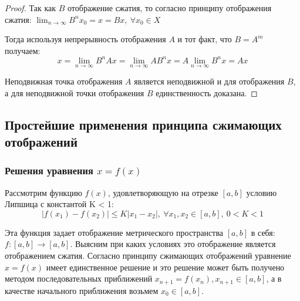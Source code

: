 \documentclass[14pt,a4paper]{extarticle}
\theoremstyle{definition}
\theoremstyle{remark}
\renewcommand{\[}{\begin{dmath*}[compact]}
\renewcommand{\]}{\end{dmath*}}
\newcommand{\ds}{\displaystyle}
\newcommand{\sep}{ , \ \allowbreak }
\begin{document}
\begin{proof}
  Так как $B$ отображение сжатия, то согласно принципу отображения сжатия:
  $\ds {\lim_{n\to \infty}B^{n}x_{0}=x=Bx}\sep{\forall x_{0}\in X}$

  Тогда используя непрерывность отображения $A$ и тот факт,
  что $B=A^{m}$ получаем:
  \[ x = \lim_{n\to \infty}B^{n}Ax =
  \lim_{n\to \infty}AB^{n}x =
  A\lim_{n\to \infty}B^{n}x = Ax\]

  Неподвижная точка отображения $A$ является неподвижной и для отображения $B$,
  а для неподвижной точки отображения $B$ единственность доказана.
\end{proof}

\subsection{Простейшие применения принципа сжимающих отображений}

\subsubsection{Решения уравнения \texorpdfstring{$x=f(x)$}{Lg}}

Рассмотрим функцию $f(x)$, удовлетворяющую на отрезке $[a, b]$ условию Липшица
с константой K < 1:
\[ |f(x_1)-f(x_2)|\leq K|x_1-x_2|\sep{\forall x_1, x_2 \in [a, b]} \sep
{0<K<1}\]

Эта функция задает отображение метрического пространства $[a, b]$ в себя:
$f:[a,b] \to[a, b]$.
Выясним при каких условиях это отображение является отображением сжатия.
Согласно принципу сжимающих отображений уравнение $x=f(x)$ имеет
единственное решение и это решение может быть получено
методом последовательных приближений $x_{n+1}=f(x_n), x_{n+1} \in [a, b]$,
а в качестве начального приближения возьмем $x_0 \in [a, b]$.

\end{document}
